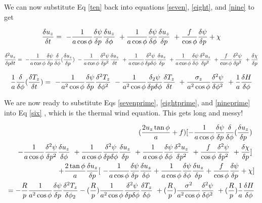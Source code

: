 \documentclass{article}
\begin{document}
We can now substitute Eq \ref{ten} back into equations \ref{seven}, 
\ref{eight}, and \ref{nine} to get

\begin{equation}
\frac{\delta u_z}{\delta t} = \
- \frac{1}{a\cos{\phi}} \frac{\delta \psi}{\delta p} \frac{\delta u_z}{\delta \phi} \
+ \frac{1}{a\cos{\phi}} \frac{\delta \psi}{\delta \phi} \frac{\delta u_z}{\delta p} \
+ \frac{f}{\cos{\phi}} \frac{\delta \psi}{\delta p} + \chi
\label{eightprime}
\end{equation}

\begin{equation}
\frac{\delta^2 u_z}{\delta p \delta t} = \
- \frac{1}{a\cos{\phi}} \frac{\delta \psi}{\delta p} \frac{\delta}{\delta \phi} (\frac{\delta u_z}{\delta p}) \
- \frac{1}{a\cos{\phi}} \frac{\delta^2 \psi}{\delta p^2} \frac{\delta u_z}{\delta t} \
+ \frac{1}{a\cos{\phi}} \frac{\delta^2 \psi}{\delta p \delta \phi} \frac{\delta u_z}{\delta p} \
+ \frac{1}{a\cos{\phi}} \frac{\delta \psi}{\delta \phi} \frac{\delta^2 u_z }{\delta p^2} \
+ \frac{f}{\cos \phi} \frac{\delta^2 \psi}{\delta p^2} \
+ \frac{\delta \chi}{\delta p}
\label{sevenprime}
\end{equation}

\begin{equation}
\frac{1}{a} \frac{\delta}{\delta \phi} (\frac{\delta T_z}{\delta t}) = \
- \frac{1}{a^2 \cos{\phi}} \frac{\delta \psi}{\delta p} \frac{\delta^2 T_z}{\delta \phi^2} \
- \frac{1}{a^2 \cos{\phi}} \frac{\delta_2 \psi}{\delta p \delta \phi} \frac{\delta T_z}{\delta t} \
+ \frac{\sigma_z}{a^2 \cos \phi} \frac{\delta^2 \psi}{\delta \phi^2} \
+ \frac{1}{a} \frac{\delta H}{\delta \phi}
\label{nineprime}
\end{equation}

We are now ready to substitute Eqs \ref{sevenprime}, \ref{eightprime}, and 
\ref{nineprime} into Eq \ref{six} , which is the thermal wind equation.  This
gets long and messy!

\begin{eqnarray}
(\frac{2 u_z \tan \phi}{a} + f) [ - \frac{1}{a\cos{\phi}} \frac{\delta \psi}{\delta p} \frac{\delta}{\delta \phi} (\frac{\delta u_z}{\delta p}) \
\\
- \frac{1}{a\cos{\phi}} \frac{\delta^2 \psi}{\delta p^2} \frac{\delta u_z}{\delta \phi} \
+ \frac{1}{a\cos{\phi}} \frac{\delta^2 \psi}{\delta p \delta \phi} \frac{\delta u_z}{\delta p} \
+ \frac{1}{a\cos{\phi}} \frac{\delta \psi}{\delta \phi} \frac{\delta^2 u_z}{\delta p^2} \
+ \frac{f}{\cos \phi} \frac{\delta^2 \psi}{\delta p^2} \
+ \frac{\delta \chi}{\delta p} ] \
\nonumber\\
+ \frac{2 \tan \phi}{a} \frac{\delta u_z}{\delta p} [ \
- \frac{1}{a\cos{\phi}} \frac{\delta \psi}{\delta p} \frac{\delta u_z}{\delta \phi}
+ \frac{1}{a\cos{\phi}} \frac{\delta \psi}{\delta \phi} \frac{\delta u_z}{\delta p} 
+ \frac{f}{\cos \phi} \frac{\delta \psi}{\delta p}
+ \chi ]
\nonumber\\
= - \frac{R}{p} \frac{1}{a^2 \cos{\phi}} \frac{\delta \psi}{\delta p} \frac{\delta^2 T_z}{\delta \phi_2}
- (\frac{R}{p}) \frac{1}{a^2 \cos{\phi}} \frac{\delta^2 \psi}{\delta p \delta \phi} \frac{\delta T_z}{\delta \phi} \
+ (\frac{R}{p}) \frac{\sigma^2}{a^2 \cos{\phi}} \frac{\delta^2 \psi}{\delta \phi^2} \
+ (\frac{R}{p}) \frac{1}{a} \frac{\delta H}{\delta \phi}
\end{eqnarray}
\end{document}
